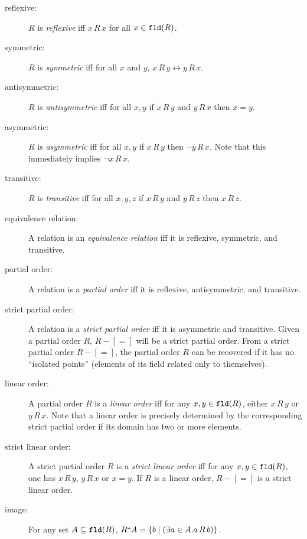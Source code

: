\documentclass[12pt]{book}
\begin{document}
\begin{description}

\item [reflexive:] $R$ is {\em reflexive\/} iff $x\,R\,x$ for all $x \in {\tt fld}(R)$.

\item[symmetric:]  $R$ is {\em symmetric\/} iff for all $x$ and $y$, $x\,R\,y \leftrightarrow y\,R\,x$.

\item[antisymmetric:]  $R$ is {\em antisymmetric\/} iff for all $x,y$ if $x\,R\,y$ and $y\,R\,x$ then $x=y$.

\item[asymmetric:] $R$ is {\em asymmetric\/} iff for all $x,y$ if $x\,R\,y$
then $\neg y \,R\,x$.  Note that this immediately implies $\neg x\,R\,x$.

\item[transitive:]  $R$ is {\em transitive\/} iff for all $x,y,z$ if $x\,R\,y$ and $y\,R\,z$ then $x\,R\,z$.

\item[equivalence relation:]  A relation is an {\em equivalence relation\/} iff it is reflexive, symmetric, and transitive.

\item[partial order:] A relation is a {\em partial order\/} iff it is
reflexive, antisymmetric, and transitive.

\item[strict partial order:] A relation is a {\em strict partial order\/} iff
it is asymmetric and transitive.  Given a partial order $R$, $R-[=]$
will be a strict partial order.  From a strict partial order $R-[=]$,
the partial order $R$ can be recovered if it has  no ``isolated
points'' (elements of its field related only to themselves).

\item[linear order:] A partial order $R$ is a {\em linear order\/} iff
for any $x,y \in {\tt fld}(R)$, either $x \,R\,y$ or $y\,R\,x$.  Note
that a linear order is precisely determined by the corresponding
strict partial order if its domain has two or more elements.

\item[strict linear order:] A strict partial order $R$ is a {\em strict
linear order\/} iff for any $x,y \in {\tt fld}(R)$, one has $x\,R\,y$,
$y\,R\,x$ or $x=y$.  If $R$ is a linear order, $R-[=]$ is a strict
linear order.

\item[image:]  For any set $A\subseteq {\tt fld}(R)$, $R``A = \{b \mid (\exists a \in A.a\,R\,b)\}$.


\end{description}
\end{document}
